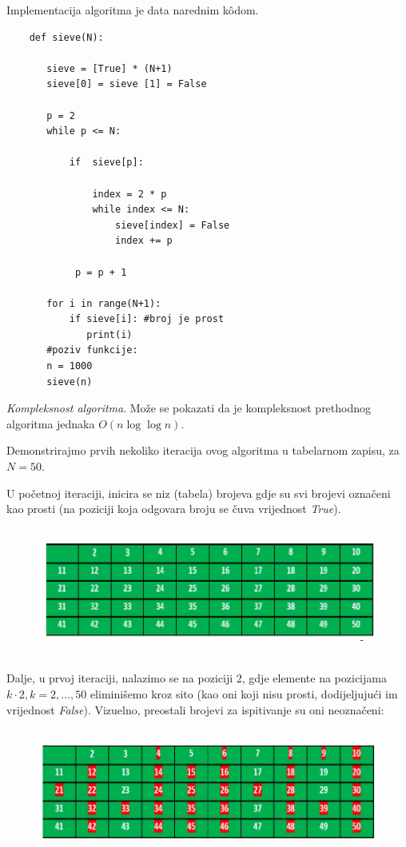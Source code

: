 Implementacija algoritma je data narednim k\^odom. 

\begin{verbatim}
	def sieve(N):
	   
	   sieve = [True] * (N+1)
	   sieve[0] = sieve [1] = False
	   
	   p = 2
	   while p <= N:
	       
	       if  sieve[p]:
	        
	           index = 2 * p
	           while index <= N:
	               sieve[index] = False
	               index += p
	           
	        p = p + 1
	   
	   for i in range(N+1):
	       if sieve[i]: #broj je prost
	          print(i)
       #poziv funkcije:
       n = 1000
       sieve(n)
\end{verbatim}  
\textit{Kompleksnost algoritma}.  Može se pokazati da je kompleksnost prethodnog algoritma jednaka $O(n \log\log n )$. 


Demonstrirajmo   prvih nekoliko iteracija ovog algoritma u tabelarnom zapisu, za $N=50.$ 

U početnoj iteraciji, inicira se niz (tabela) brojeva gdje su svi brojevi označeni kao prosti (na poziciji koja odgovara broju se čuva vrijednost \emph{True}).

\begin{figure}[H]
	 \centering
	 \includegraphics[width=340pt,height=120pt]{slike/sieve-it-0.png}
\end{figure}


Dalje, u prvoj iteraciji, nalazimo se na poziciji 2, gdje elemente na pozicijama $k\cdot 2, k=2, \ldots, 50$ eliminišemo kroz sito (kao oni koji nisu prosti, dodijeljujući im vrijednost \emph{False}). Vizuelno, preostali brojevi za ispitivanje su oni neoznačeni:


\begin{figure}[H]
	\centering
	\includegraphics[width=340pt,height=120pt]{slike/sieve-it-1.png}
\end{figure}




